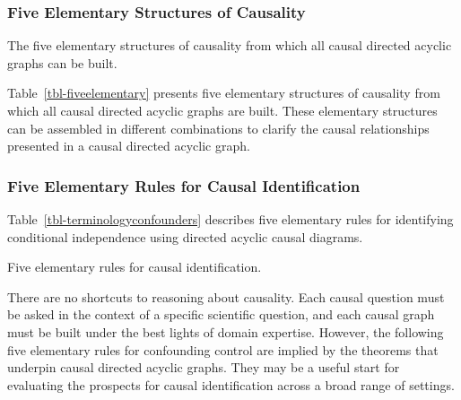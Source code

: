 \documentclass[
  single column]{article}
\begin{document}
\subsubsection{Five Elementary Structures of
Causality}\label{five-elementary-structures-of-causality}

\begin{table}

\caption{\label{tbl-fiveelementary}The five elementary structures of
causality from which all causal directed acyclic graphs can be built.}

\centering{

\terminologydirectedgraph

}

\end{table}%

Table~\ref{tbl-fiveelementary} presents five elementary structures of
causality from which all causal directed acyclic graphs are built. These
elementary structures can be assembled in different combinations to
clarify the causal relationships presented in a causal directed acyclic
graph.

\newpage{}

\subsubsection{Five Elementary Rules for Causal
Identification}\label{five-elementary-rules-for-causal-identification}

Table~\ref{tbl-terminologyconfounders} describes five elementary rules
for identifying conditional independence using directed acyclic causal
diagrams.

\begin{table}

\caption{\label{tbl-terminologyconfounders}Five elementary rules for
causal identification.}

\centering{

\terminologyelconfounders

}

\end{table}%

There are no shortcuts to reasoning about causality. Each causal
question must be asked in the context of a specific scientific question,
and each causal graph must be built under the best lights of domain
expertise. However, the following five elementary rules for confounding
control are implied by the theorems that underpin causal directed
acyclic graphs. They may be a useful start for evaluating the prospects
for causal identification across a broad range of settings.
\end{document}
